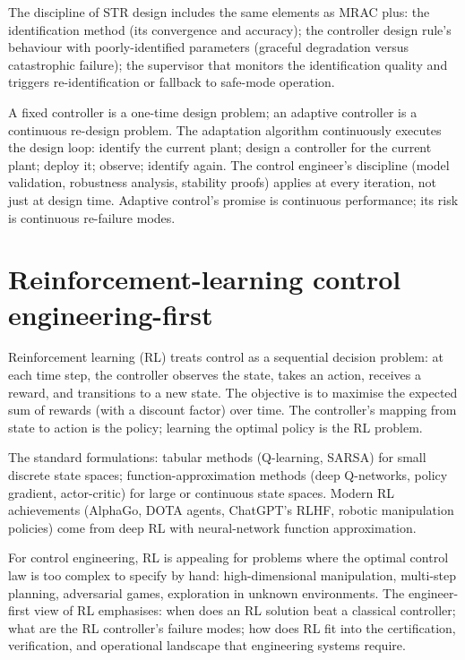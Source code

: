 The discipline of STR design includes the same elements as MRAC plus: the identification method (its convergence and accuracy); the controller design rule's behaviour with poorly-identified parameters (graceful degradation versus catastrophic failure); the supervisor that monitors the identification quality and triggers re-identification or fallback to safe-mode operation.

\begin{archetype}
A fixed controller is a one-time design problem; an adaptive controller is a continuous re-design problem. The adaptation algorithm continuously executes the design loop: identify the current plant; design a controller for the current plant; deploy it; observe; identify again. The control engineer's discipline (model validation, robustness analysis, stability proofs) applies at every iteration, not just at design time. Adaptive control's promise is continuous performance; its risk is continuous re-failure modes.
\end{archetype}

\section{Reinforcement-learning control engineering-first}

Reinforcement learning (RL) treats control as a sequential decision problem: at each time step, the controller observes the state, takes an action, receives a reward, and transitions to a new state. The objective is to maximise the expected sum of rewards (with a discount factor) over time. The controller's mapping from state to action is the policy; learning the optimal policy is the RL problem.

The standard formulations: tabular methods (Q-learning, SARSA) for small discrete state spaces; function-approximation methods (deep Q-networks, policy gradient, actor-critic) for large or continuous state spaces. Modern RL achievements (AlphaGo, DOTA agents, ChatGPT's RLHF, robotic manipulation policies) come from deep RL with neural-network function approximation.

For control engineering, RL is appealing for problems where the optimal control law is too complex to specify by hand: high-dimensional manipulation, multi-step planning, adversarial games, exploration in unknown environments. The engineer-first view of RL emphasises: when does an RL solution beat a classical controller; what are the RL controller's failure modes; how does RL fit into the certification, verification, and operational landscape that engineering systems require.

